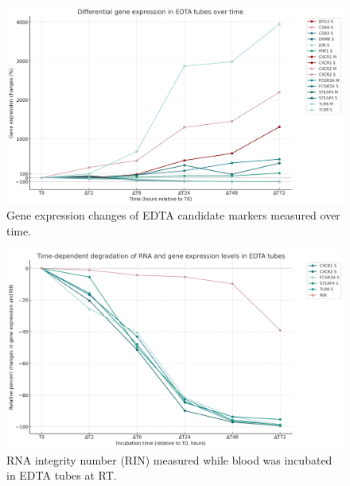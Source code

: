 \documentclass[fleqn,10pt]{wlscirep}
\begin{document}
\begin{figure}[ht]
    \centering
    \includegraphics[width=\linewidth]{figure2}
    \caption{Gene expression changes of EDTA candidate markers measured over time.}
    \label{fig:figure2}
    \end{figure}

\begin{figure}[ht]
    \centering
    \includegraphics[width=\linewidth]{figure3}
    \caption{RNA integrity number (RIN) measured while blood was incubated in EDTA tubes at RT.}
    \label{fig:figure3}
    \end{figure}
\end{document}
